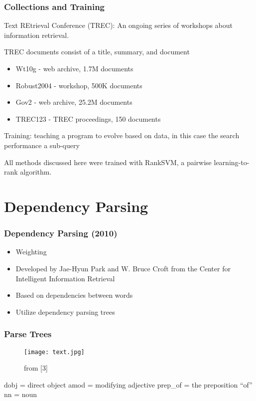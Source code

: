 \documentclass{beamer}
\begin{document}
\begin{frame}[fragile]\frametitle{Collections and Training}
Text REtrieval Conference (TREC): An ongoing series of workshops about
information retrieval. \pause

TREC documents consist of a title, summary, and document \pause

\begin{itemize} 
\item{Wt10g} - web archive, 1.7M documents \pause
\item{Robust2004} - workshop, 500K documents \pause
\item{Gov2} - web archive, 25.2M documents \pause
\item{TREC123} - TREC proceedings, 150 documents
\end{itemize} \vspace*{.5cm}\pause

Training: teaching a program to evolve based on data, in this
case the search performance a sub-query

All methods discussed here were trained with RankSVM, a pairwise
learning-to-rank algorithm.

\end{frame}

\section{Dependency Parsing}

\begin{frame}[fragile]\frametitle{Dependency Parsing (2010)}
\begin{itemize}
\item{Weighting} \pause
\item{Developed by Jae-Hyun Park and W. Bruce Croft from the Center for Intelligent Information Retrieval} \pause
\item{Based on dependencies between words} \pause
\item Utilize dependency parsing trees 
\end{itemize}
\end{frame}

\begin{frame}[fragile]\frametitle{Parse Trees}
\begin{center}
\begin{figure}
\texttt{[image: text.jpg]}
\caption{from [3]}
\end{figure}
\end{center}
dobj = direct object\linebreak
amod = modifying adjective\linebreak
prep\_of = the preposition ``of'' \linebreak
nn = noun
\end{frame}
\end{document}
